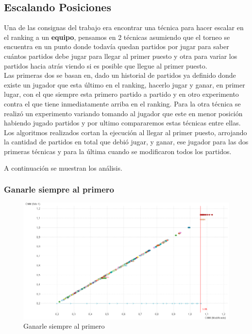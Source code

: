 \subsection{Escalando Posiciones}

Una de las consignas del trabajo era encontrar una técnica para hacer escalar en el ranking a un \textbf{equipo}, pensamos en 2 técnicas asumiendo que el torneo se encuentra en un punto donde todavía quedan partidos por jugar para saber cuántos partidos debe jugar para llegar al primer puesto y otra para variar los partidos hacia atrás viendo si es posible que llegue al primer puesto. 
\\
Las primeras dos se basan en, dado un historial de partidos ya definido donde existe un jugador que esta último en el ranking, hacerlo jugar y ganar, en primer lugar, con el que siempre esta primero partido a partido y en otro experimento contra el que tiene inmediatamente arriba en el ranking. Para la otra técnica se realizó un experimento variando tomando al jugador que este en menor posición habiendo jugado partidos y por ultimo compararemos estas técnicas entre ellas.
\\
Los algoritmos realizados cortan la ejecución al llegar al primer puesto, arrojando la cantidad de partidos en total que debió jugar, y ganar, ese jugador para las dos primeras técnicas y para la última cuando se modificaron todos los partidos.

A continuación se muestran los análisis.

\subsubsection{Ganarle siempre al primero}

\begin{figure}[H]
\centering
\includegraphics[width=1\textwidth]{IMG/estrategia 5.png}
\caption{Ganarle siempre al primero}
\label{fig: Ganarle siempre al primero}
\end{figure}

